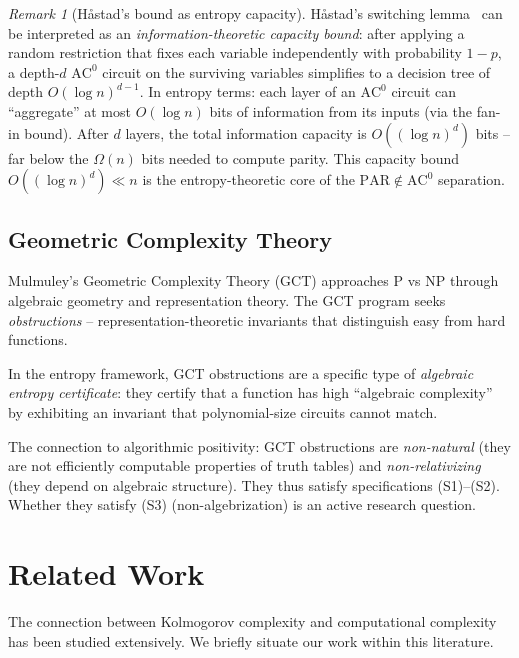 \documentclass[aps,prd,twocolumn,superscriptaddress,nofootinbib]{revtex4-2}
\theoremstyle{definition}
\theoremstyle{remark}
\newtheorem{remark}[theorem]{Remark}
\newcommand{\NP}{\mathrm{NP}}
\newcommand{\PP}{\mathrm{P}}
\begin{document}
\begin{remark}[H\r{a}stad's bound as entropy capacity]
\label{rem:hastad-entropy}
H\r{a}stad's switching lemma~\cite{Hastad1987} can be interpreted as an \emph{information-theoretic capacity bound}: after applying a random restriction that fixes each variable independently with probability $1-p$, a depth-$d$ $\mathrm{AC}^0$ circuit on the surviving variables simplifies to a decision tree of depth $O(\log n)^{d-1}$. In entropy terms: each layer of an $\mathrm{AC}^0$ circuit can ``aggregate'' at most $O(\log n)$ bits of information from its inputs (via the fan-in bound). After $d$ layers, the total information capacity is $O((\log n)^d)$ bits -- far below the $\Omega(n)$ bits needed to compute parity. This capacity bound $O((\log n)^d) \ll n$ is the entropy-theoretic core of the $\mathrm{PAR} \notin \mathrm{AC}^0$ separation.
\end{remark}

\subsection{Geometric Complexity Theory}

Mulmuley's Geometric Complexity Theory (GCT) \cite{Mulmuley2011} approaches $\PP$ vs $\NP$ through algebraic geometry and representation theory. The GCT program seeks \textit{obstructions} -- representation-theoretic invariants that distinguish easy from hard functions.

In the entropy framework, GCT obstructions are a specific type of \textit{algebraic entropy certificate}: they certify that a function has high ``algebraic complexity'' by exhibiting an invariant that polynomial-size circuits cannot match.

The connection to algorithmic positivity: GCT obstructions are \textit{non-natural} (they are not efficiently computable properties of truth tables) and \textit{non-relativizing} (they depend on algebraic structure). They thus satisfy specifications (S1)--(S2). Whether they satisfy (S3) (non-algebrization) is an active research question.


\section{Related Work}
\label{sec:related}

The connection between Kolmogorov complexity and computational complexity has been studied extensively. We briefly situate our work within this literature.
\end{document}
